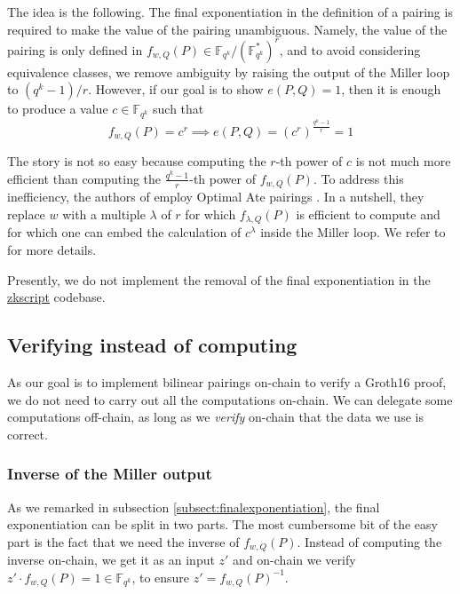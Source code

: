 \documentclass{article}
\newcommand{\fq}[1]{\mathbb{F}_{q^{#1}}}
\theoremstyle{remark}
\theoremstyle{plain}
\begin{document}
The idea is the following.
The final exponentiation in the definition of a pairing is required to make the value of the pairing unambiguous.
Namely, the value of the pairing is only defined in $f_{w,Q}(P) \in \fq{k} / (\fq{k}^\ast)^r$, and to avoid considering equivalence classes, we remove ambiguity by raising the output of the Miller loop to $(q^k-1)/r$.
However, if our goal is to show $e(P,Q) = 1$, then it is enough to produce a value $c \in \fq{k}$ such that
\[
    f_{w,Q}(P) = c^r \implies e(P,Q) = (c^r)^{\frac{q^k-1}{r}} = 1
\]

The story is not so easy because computing the $r$-th power of $c$ is not much more efficient than computing the $\frac{q^k-1}{r}$-th power of $f_{w,Q}(P)$.
To address this inefficiency, the authors of \cite{NE-on-proving-pairings} employ Optimal Ate pairings \cite{V-optimal-ate-pairings}.
In a nutshell, they replace $w$ with a multiple $\lambda$ of $r$ for which $f_{\lambda,Q}(P)$ is efficient to compute and for which one can embed the calculation of $c^{\lambda}$ inside the Miller loop.
We refer to \cite{NE-on-proving-pairings} for more details.

Presently, we do not implement the removal of the final exponentiation in the \href{https://github.com/nchain-innovation/zkscript_package}{zkscript} codebase.

\subsection{Verifying instead of computing}

As our goal is to implement bilinear pairings on-chain to verify a Groth16 proof, we do not need to carry out all the computations on-chain.
We can delegate some computations off-chain, as long as we \emph{verify} on-chain that the data we use is correct.

\subsubsection{Inverse of the Miller output}
\label{subsubsect:inverseMillerOutput}

As we remarked in subsection \ref{subsect:finalexponentiation}, the final exponentiation can be split in two parts.
The most cumbersome bit of the easy part is the fact that we need the inverse of $f_{w,Q}(P)$.
Instead of computing the inverse on-chain, we get it as an input $z'$ and on-chain we verify $z' \cdot f_{w,Q}(P) = 1 \in \fq{k}$, to ensure $z' = f_{w,Q}(P)^{-1}$.
\end{document}
